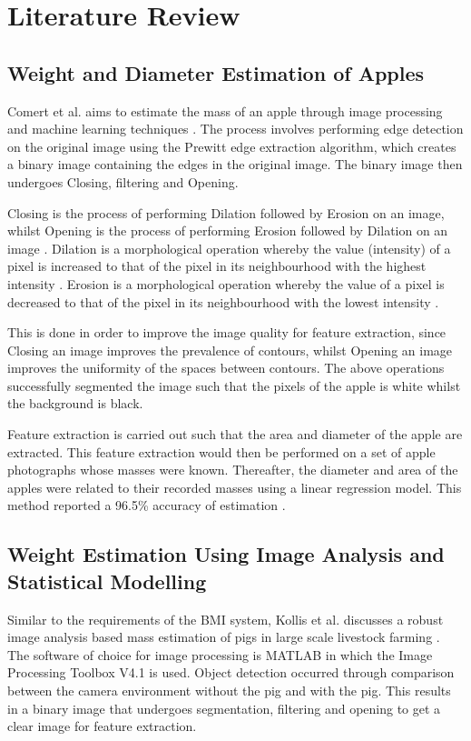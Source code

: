 \documentclass[conference]{IEEEtran}
\begin{document}
\section{Literature Review}
\subsection{Weight and Diameter Estimation of Apples}
Comert et al. aims to estimate the mass of an apple through image processing and machine learning techniques \cite{comert}.
The process involves performing edge detection on the original image using the Prewitt edge extraction algorithm, which creates a binary image containing the edges in the original image.
The binary image then undergoes Closing, filtering and Opening.

Closing is the process of performing Dilation followed by Erosion on an image, whilst Opening is the process of performing Erosion followed by Dilation on an image \cite{opening,closing}.
Dilation is a morphological operation whereby the value (intensity) of a pixel is increased to that of the pixel in its neighbourhood with the highest intensity \cite{mathworksdilationerosion}.
Erosion is a morphological operation whereby the value of a pixel is decreased to that of the pixel in its neighbourhood with the lowest intensity \cite{mathworksdilationerosion}.

This is done in order to improve the image quality for feature extraction, since Closing an image improves the prevalence of contours, whilst Opening an image improves the uniformity of the spaces between contours.
The above operations successfully segmented the image such that the pixels of the apple is white whilst the background is black.

Feature extraction is carried out such that the area and diameter of the apple are extracted.
This feature extraction would then be performed on a set of apple photographs whose masses were known.
Thereafter, the diameter and area of the apples were related to their recorded masses using a linear regression model.
This method reported a 96.5\% accuracy of estimation \cite{comert}.

\subsection{Weight Estimation Using Image Analysis and Statistical Modelling}
Similar to the requirements of the BMI system, Kollis et al. discusses a robust image analysis based mass estimation of pigs in large scale livestock farming \cite{kollis2007weight}. 
The software of choice for image processing is MATLAB in which the Image Processing Toolbox V4.1 is used.
Object detection occurred through comparison between the camera environment without the pig and with the pig.
This results in a binary image that undergoes segmentation, filtering and opening to get a clear image for feature extraction.
\end{document}
